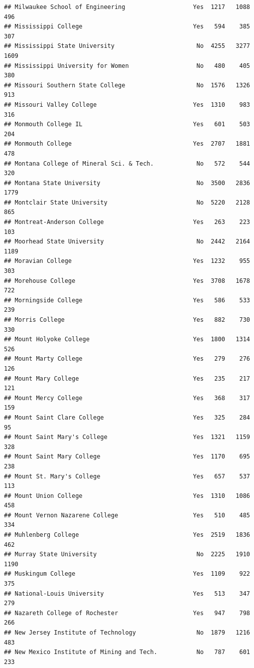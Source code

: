\documentclass[
]{article}
\begin{document}
\begin{verbatim}
## Milwaukee School of Engineering                   Yes  1217   1088    496
## Mississippi College                               Yes   594    385    307
## Mississippi State University                       No  4255   3277   1609
## Mississippi University for Women                   No   480    405    380
## Missouri Southern State College                    No  1576   1326    913
## Missouri Valley College                           Yes  1310    983    316
## Monmouth College IL                               Yes   601    503    204
## Monmouth College                                  Yes  2707   1881    478
## Montana College of Mineral Sci. & Tech.            No   572    544    320
## Montana State University                           No  3500   2836   1779
## Montclair State University                         No  5220   2128    865
## Montreat-Anderson College                         Yes   263    223    103
## Moorhead State University                          No  2442   2164   1189
## Moravian College                                  Yes  1232    955    303
## Morehouse College                                 Yes  3708   1678    722
## Morningside College                               Yes   586    533    239
## Morris College                                    Yes   882    730    330
## Mount Holyoke College                             Yes  1800   1314    526
## Mount Marty College                               Yes   279    276    126
## Mount Mary College                                Yes   235    217    121
## Mount Mercy College                               Yes   368    317    159
## Mount Saint Clare College                         Yes   325    284     95
## Mount Saint Mary's College                        Yes  1321   1159    328
## Mount Saint Mary College                          Yes  1170    695    238
## Mount St. Mary's College                          Yes   657    537    113
## Mount Union College                               Yes  1310   1086    458
## Mount Vernon Nazarene College                     Yes   510    485    334
## Muhlenberg College                                Yes  2519   1836    462
## Murray State University                            No  2225   1910   1190
## Muskingum College                                 Yes  1109    922    375
## National-Louis University                         Yes   513    347    279
## Nazareth College of Rochester                     Yes   947    798    266
## New Jersey Institute of Technology                 No  1879   1216    483
## New Mexico Institute of Mining and Tech.           No   787    601    233

\end{verbatim}
\end{document}
